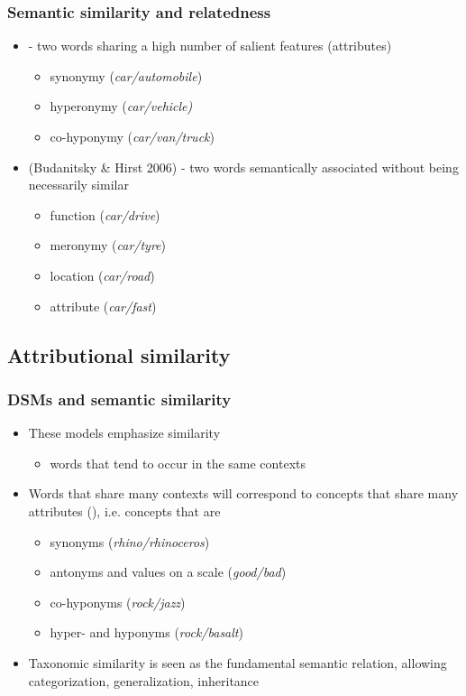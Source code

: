 \begin{frame}
\frametitle{Semantic similarity and relatedness}

\begin{itemize}
\item {} - two words sharing a high 
number of  salient features (attributes)
\begin{itemize}
\item synonymy (\emph{car/automobile})
\item hyperonymy (\emph{car/vehicle)}
\item co-hyponymy (\emph{car/van/truck})
\end{itemize}
\pause
\item {} (Budanitsky \& Hirst 2006) - two words semantically
associated without being necessarily similar
\begin{itemize}
\item function (\emph{car/drive})
\item meronymy (\emph{car/tyre})
\item location (\emph{car/road})
\item attribute (\emph{car/fast})
\end{itemize}
\end{itemize}
\end{frame}

\subsection{Attributional similarity}

\begin{frame}
  \frametitle{DSMs and semantic similarity}
  \begin{itemize}
   \item These models emphasize  similarity
   \begin{itemize}
    \item words that tend to occur in the same contexts
    \end{itemize}
  \item Words that share many contexts will correspond to concepts
    that share many attributes (),
    i.e. concepts that are 
    \begin{itemize}
    \item synonyms (\emph{rhino/rhinoceros})
    \item antonyms and values on a
      scale (\emph{good/bad})
      \item co-hyponyms (\emph{rock/jazz})
      \item hyper- and hyponyms (\emph{rock/basalt})
    \end{itemize}
  \item Taxonomic similarity is seen as the fundamental semantic
    relation, allowing categorization, generalization, inheritance
  \end{itemize}
\end{frame}



